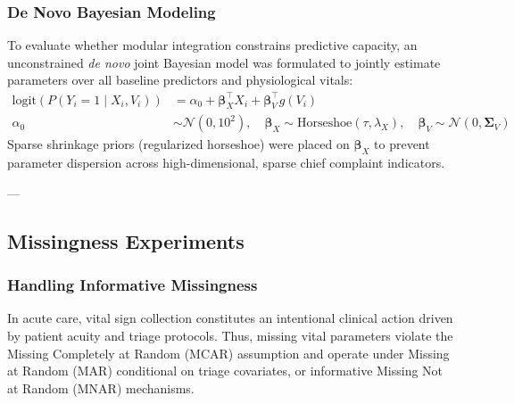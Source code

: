 \subsubsection{De Novo Bayesian Modeling}
To evaluate whether modular integration constrains predictive capacity, an unconstrained \textit{de novo} joint Bayesian model was formulated to jointly estimate parameters over all baseline predictors and physiological vitals:
\begin{align}
    \text{logit}(P(Y_i = 1 \mid X_i, V_i)) &= \alpha_0 + \boldsymbol{\beta}_X^\top X_i + \boldsymbol{\beta}_V^\top g(V_i) \\
    \alpha_0 &\sim \mathcal{N}(0, 10^2), \quad \boldsymbol{\beta}_X \sim \text{Horseshoe}(\tau, \lambda_X), \quad \boldsymbol{\beta}_V \sim \mathcal{N}(0, \boldsymbol{\Sigma}_V)
\end{align}
Sparse shrinkage priors (regularized horseshoe) were placed on $\boldsymbol{\beta}_X$ to prevent parameter dispersion across high-dimensional, sparse chief complaint indicators.

---

\subsection{Missingness Experiments}
\label{subsec:missingness}

\subsubsection{Handling Informative Missingness}
In acute care, vital sign collection constitutes an intentional clinical action driven by patient acuity and triage protocols. Thus, missing vital parameters violate the Missing Completely at Random (MCAR) assumption and operate under Missing at Random (MAR) conditional on triage covariates, or informative Missing Not at Random (MNAR) mechanisms.

